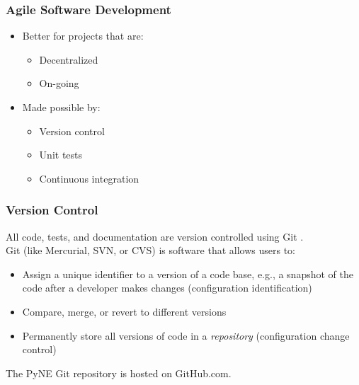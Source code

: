\documentclass[12pt]{beamer}
\begin{document}
\begin{frame}
\frametitle{Agile Software Development}

\begin{itemize}
\item{Better for projects that are:}
    \begin{itemize}
    \item{Decentralized}
    \item{On-going}
    \end{itemize}
\item{Made possible by:}
    \begin{itemize}
    \item{Version control}
    \item{Unit tests}
    \item{Continuous integration}
    \end{itemize}
\end{itemize}

\end{frame}


\begin{frame}
\frametitle{Version Control}

All code, tests, and documentation are version controlled using Git \cite{git}. \\
\vspace{0.3cm}
Git (like Mercurial, SVN, or CVS) is software that allows users to:
\begin{itemize}
\item{Assign a unique identifier to a version of a code base, e.g., a snapshot of 
      the code after a developer makes changes (\alert{configuration identification})}
\item{Compare, merge, or revert to different versions}
\item{Permanently store all versions of code in a \emph{repository} (\alert{configuration change control})}
\end{itemize}
\vspace{0.3cm}
The PyNE Git repository is hosted on GitHub.com.

\end{frame}
\end{document}
